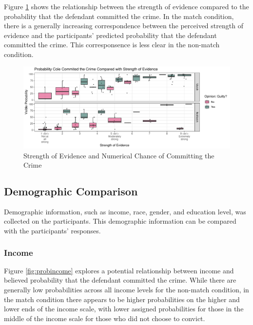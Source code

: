 \documentclass[print]{nuthesis}
\begin{document}
Figure \ref{fig:strengthprob} shows the relationship between the strength of evidence compared to the probability that the defendant committed the crime.
In the match condition, there is a generally increasing correspondence between the perceived strength of evidence and the participants' predicted probability that the defendant committed the crime.
This corresponsence is less clear in the non-match condition.

\begin{figure}

{\centering \includegraphics[width=\linewidth]{thesis_files/figure-latex/strengthprob-1} 

}

\caption{Strength of Evidence and Numerical Chance of Committing the Crime}\label{fig:strengthprob}
\end{figure}

\hypertarget{demographic-comparison}{%
\subsection{Demographic Comparison}\label{demographic-comparison}}

Demographic information, such as income, race, gender, and education level, was collected on the participants.
This demographic information can be compared with the participants' responses.

\hypertarget{income}{%
\subsubsection{Income}\label{income}}

Figure \ref{fig:probincome} explores a potential relationship between income and believed probability that the defendant committed the crime.
While there are generally low probabilities across all income levels for the non-match condition, in the match condition there appears to be higher probabilities on the higher and lower ends of the income scale, with lower assigned probabilities for those in the middle of the income scale for those who did not choose to convict.
\end{document}
